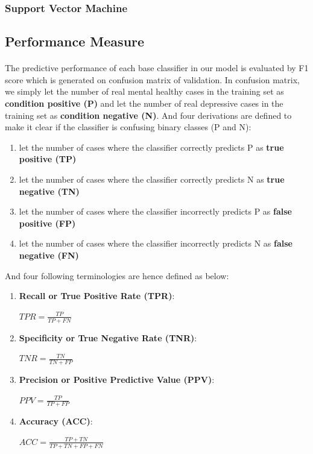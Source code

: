 \documentclass[runningheads]{llncs}
\begin{document}
\subsubsection{Support Vector Machine}
%
%
%
%
%
\subsection{Performance Measure}
\paragraph{}
The predictive performance of each base classifier in our model is evaluated by F1 score which is generated on confusion matrix of validation. In confusion matrix, we simply let the number of real mental healthy cases in the training set as \textbf{condition positive (P)} and let the number of real depressive cases in the training set as  \textbf{condition negative (N)}. And four derivations are defined to make it clear if the classifier is confusing binary classes (P and N):  \\
\begin{enumerate}[label=(\roman*)]
\item let the number of cases where the classifier correctly predicts P as \textbf{ true positive (TP)}
\item let the number of cases where the classifier correctly predicts N as \textbf{true negative (TN)}
\item let the number of cases where the classifier incorrectly predicts P as \textbf{false positive (FP)}
\item let the number of cases where the classifier incorrectly predicts N as \textbf{false negative (FN)}
\end{enumerate}
And four following terminologies are hence defined as below:
\begin{enumerate}[label=\alph*)]
\item \textbf{ Recall or True Positive Rate (TPR)}: \\ 
		\begin{center} $\displaystyle TPR = \frac{TP}{TP + FN} $ \end{center}
\item \textbf{Specificity or True Negative Rate (TNR)}: \\ 
		\begin{center} $\displaystyle TNR = \frac{TN}{TN + FP} $ \end{center}
\item \textbf{Precision or Positive Predictive Value (PPV)}: \\
		\begin{center} $\displaystyle PPV = \frac{TP}{TP + FP} $ \end{center}
\item \textbf{Accuracy (ACC)}: \\ 
		\begin{center} $\displaystyle ACC = \frac{TP + TN}{TP + TN + FP + FN} $ \end{center}
\end{enumerate}
\end{document}
